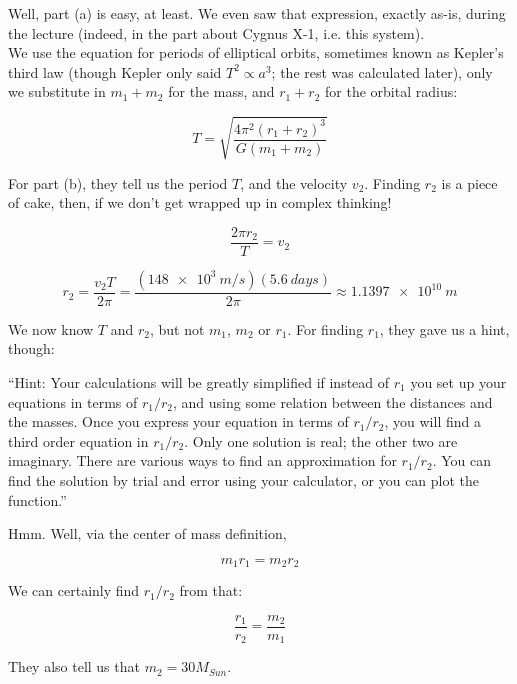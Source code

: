 \documentclass[8.01x]{subfiles}
\begin{document}
Well, part (a) is easy, at least. We even saw that expression, exactly as-is, during the lecture (indeed, in the part about Cygnus X-1, i.e. this system).\\
We use the equation for periods of elliptical orbits, sometimes known as Kepler's third law (though Kepler only said $T^2 \propto a^3$; the rest was calculated later), only we substitute in $m_1 + m_2$ for the mass, and $r_1 + r_2$ for the orbital radius:

\begin{equation}
T = \sqrt{\frac{4 \pi^2 (r_1 + r_2)^3}{G (m_1 + m_2)}}
\end{equation}

For part (b), they tell us the period $T$, and the velocity $v_2$. Finding $r_2$ is a piece of cake, then, if we don't get wrapped up in complex thinking!

\begin{equation}
\frac{2 \pi r_2}{T} = v_2
\end{equation}

\begin{equation}
r_2 = \frac{v_2 T}{2 \pi} = \frac{(\SI{148e3}{m/s})(\SI{5.6}{days})}{2 \pi} \approx \SI{1.1397e10}{m}
\end{equation}

We now know $T$ and $r_2$, but not $m_1$, $m_2$ or $r_1$. For finding $r_1$, they gave us a hint, though:

``Hint: Your calculations will be greatly simplified if instead of $r_1$ you set up your equations in terms of $r_1/r_2$, and using some relation between the distances and the masses. Once you express your equation in terms of $r_1/r_2$, you will find a third order equation in $r_1/r_2$. Only one solution is real; the other two are imaginary. There are various ways to find an approximation for $r_1/r_2$. You can find the solution by trial and error using your calculator, or you can plot the function.''

Hmm. Well, via the center of mass definition,

\begin{equation}
m_1 r_1 = m_2 r_2
\end{equation}

We can certainly find $r_1/r_2$ from that:

\begin{equation}
\frac{r_1}{r_2} = \frac{m_2}{m_1}
\end{equation}

They also tell us that $m_2 = 30 M_{Sun}$.
\end{document}
